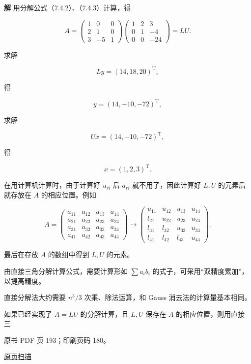 \textbf{解} 用分解公式（7.4.2）、（7.4.3）计算，得

\[A=\begin{pmatrix}1&0&0\\2&1&0\\3&-5&1\end{pmatrix}
\begin{pmatrix}1&2&3\\0&1&-4\\0&0&-24\end{pmatrix}=LU.\]

求解

\[Ly=(14,18,20)^{\mathrm T},\]

得

\[y=(14,-10,-72)^{\mathrm T},\]

求解

\[Ux=(14,-10,-72)^{\mathrm T},\]

得

\[x=(1,2,3)^{\mathrm T}.\]

在用计算机计算时，由于计算好 \(u_{ri}\) 后 \(a_{ri}\) 就不用了，因此计算好 \(L,U\) 的元素后就存放在 \(A\) 的相应位置。例如

\[
A=\begin{pmatrix}
a_{11}&a_{12}&a_{13}&a_{14}\\
a_{21}&a_{22}&a_{23}&a_{24}\\
a_{31}&a_{32}&a_{33}&a_{34}\\
a_{41}&a_{42}&a_{43}&a_{44}
\end{pmatrix}
\to\begin{pmatrix}
u_{11}&u_{12}&u_{13}&u_{14}\\
l_{21}&u_{22}&u_{23}&u_{24}\\
l_{31}&l_{32}&u_{33}&u_{34}\\
l_{41}&l_{42}&l_{43}&u_{44}
\end{pmatrix}.
\]

最后在存放 \(A\) 的数组中得到 \(L,U\) 的元素。

由直接三角分解计算公式，需要计算形如 \(\sum a_i b_i\) 的式子，可采用``双精度累加''，以提高精度。

直接分解法大约需要 \(n^3/3\) 次乘、除法运算，和 Gauss 消去法的计算量基本相同。

如果已经实现了 \(A=LU\) 的分解计算，且 \(L,U\) 保存在 \(A\) 的相应位置，则用直接三

\clearpage

原书 PDF 页 193；印刷页码 180。

\href{source-images/pdf-193.jpeg}{原页扫描}

